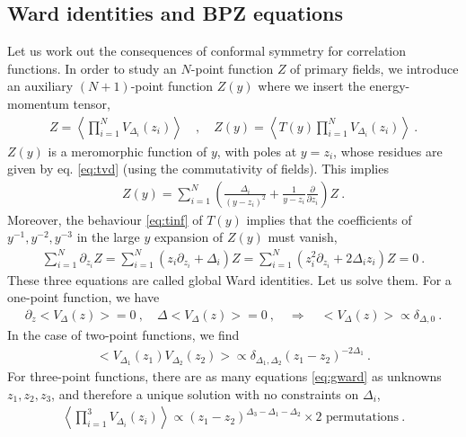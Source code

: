 \documentclass[12pt, a4paper]{article}
\theoremstyle{break}
\begin{document}
\subsection{Ward identities and BPZ equations}

Let us work out the consequences of conformal symmetry for correlation functions.
In order to study an $N$-point function $Z$ of primary fields, we introduce an auxiliary $(N+1)$-point function $Z(y)$ where we insert the energy-momentum tensor,
\begin{align}
 Z = \left< \prod_{i=1}^N V_{\Delta_i}(z_i) \right> \quad , \quad Z(y) = \left< T(y) \prod_{i=1}^N V_{\Delta_i}(z_i) \right> \ .
\end{align}
$Z(y)$ is a meromorphic function of $y$, with poles at $y=z_i$, whose residues are given by eq. \eqref{eq:tvd} (using the commutativity of fields). This implies 
\begin{align}
 Z(y) = \sum_{i=1}^N \left(\frac{\Delta_i}{(y-z_i)^2} +\frac{1}{y-z_i}\frac{\partial}{\partial z_i}\right) Z\ .
 \label{eq:zy}
\end{align}
Moreover, the behaviour \eqref{eq:tinf} of $T(y)$ implies that 
the coefficients of $y^{-1}, y^{-2}, y^{-3}$ in the large $y$ expansion of $Z(y)$ must vanish, 
\begin{align}
 \sum_{i=1}^N \partial_{z_i} Z = \sum_{i=1}^N \left(z_i \partial_{z_i} + \Delta_i\right) Z = \sum_{i=1}^N \left(z_i^2 \partial_{z_i} + 2\Delta_iz_i\right) Z = 0\ .
 \label{eq:gward}
\end{align}
These three equations are called global Ward identities. 
Let us solve them. For a one-point function, we have 
\begin{align}
\partial_z \Big< V_\Delta(z)\Big> = 0 \ , \quad \Delta \Big< V_\Delta(z)\Big> = 0\ , \quad \Rightarrow \quad \Big< V_\Delta(z)\Big> \propto \delta_{\Delta, 0}\ .
\end{align}
In the case of two-point functions, we find 
\begin{align}
 \Big< V_{\Delta_1}(z_1)V_{\Delta_2}(z_2) \Big> \propto \delta_{\Delta_1,\Delta_2} (z_1-z_2)^{-2\Delta_1} \ .
 \label{eq:2pt}
\end{align}
For three-point functions, there are as many equations \eqref{eq:gward} as unknowns $z_1,z_2,z_3$, and therefore a unique solution with no constraints on $\Delta_i$,
\begin{align}
 \left< \prod_{i=1}^3 V_{\Delta_i}(z_i) \right> \propto (z_1-z_2)^{\Delta_3-\Delta_1-\Delta_2} 
 \times \text{$2$ permutations}\ .
 \label{eq:3pt}
\end{align}
\end{document}
